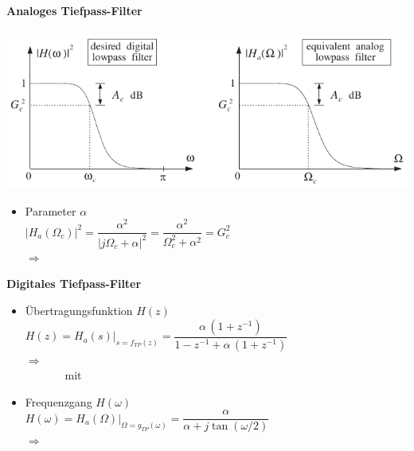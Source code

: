 	\begin{minipage}{0.48\textwidth}
		\textbf{\large{Analoges Tiefpass-Filter}}\\[0.2cm]
		\\[0.2cm]
		\includegraphics[width = \textwidth]{pic/TP1ordnung.pdf}\\[-0.5cm]
		\begin{itemize}
		 \item Parameter $\alpha$\\[0.1cm]
		 $\big|H_a(\Omega_c)\big|^2 = \dfrac{\alpha^2}{|j\Omega_c+\alpha|^2} = \dfrac{\alpha^2}{\Omega_c^2+\alpha^2} = G_c^2$\\[0.2cm]
		 $\Rightarrow\quad\;$\\[0.2cm]
		\end{itemize}
		\textbf{\large{Digitales Tiefpass-Filter}}\\[-0.25cm]
		\begin{itemize}
		 \item Übertragungsfunktion $H(z)$\\[0.05cm]
		 $H(z) = H_a(s)\Big|_{s=f_{TP}(z)}=\dfrac{\alpha\,(1+z^{-1})}{1-z^{-1}+\alpha\,(1+z^{-1})}\!\!\!\!\!\!$\\[0.25cm]
		 $\Rightarrow\quad\;$$\quad$\\[0.2cm]
		 \textcolor{white}{$\Rightarrow\quad\quad$}mit$\quad$\\[0.1cm]
		 \item Frequenzgang $H(\omega)$\\[0.2cm]
		 $H(\omega) = H_a(\Omega)\Big|_{\Omega=g_{TP}(\omega)}=\dfrac{\alpha}{\alpha + j\tan(\omega/2)}$\\[0.25cm]
		 $\Rightarrow\quad\;$
		\end{itemize}
	\end{minipage}
